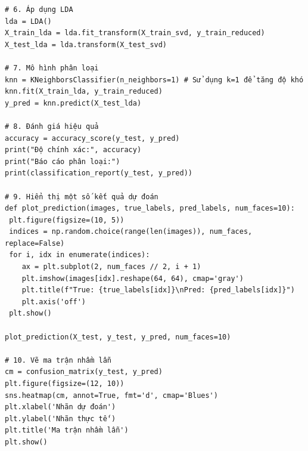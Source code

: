 \documentclass[a4paper,12pt]{extarticle}
\begin{document}
\begin{verbatim}
# 6. Áp dụng LDA
lda = LDA()
X_train_lda = lda.fit_transform(X_train_svd, y_train_reduced)
X_test_lda = lda.transform(X_test_svd)

# 7. Mô hình phân loại
knn = KNeighborsClassifier(n_neighbors=1) # Sử dụng k=1 để tăng độ khó
knn.fit(X_train_lda, y_train_reduced)
y_pred = knn.predict(X_test_lda)

# 8. Đánh giá hiệu quả
accuracy = accuracy_score(y_test, y_pred)
print("Độ chính xác:", accuracy)
print("Báo cáo phân loại:")
print(classification_report(y_test, y_pred))

# 9. Hiển thị một số kết quả dự đoán
def plot_prediction(images, true_labels, pred_labels, num_faces=10):
 plt.figure(figsize=(10, 5))
 indices = np.random.choice(range(len(images)), num_faces, replace=False)
 for i, idx in enumerate(indices):
    ax = plt.subplot(2, num_faces // 2, i + 1)
    plt.imshow(images[idx].reshape(64, 64), cmap='gray')
    plt.title(f"True: {true_labels[idx]}\nPred: {pred_labels[idx]}")
    plt.axis('off')
 plt.show()

plot_prediction(X_test, y_test, y_pred, num_faces=10)

# 10. Vẽ ma trận nhầm lẫn
cm = confusion_matrix(y_test, y_pred)
plt.figure(figsize=(12, 10))
sns.heatmap(cm, annot=True, fmt='d', cmap='Blues')
plt.xlabel('Nhãn dự đoán')
plt.ylabel('Nhãn thực tế')
plt.title('Ma trận nhầm lẫn')
plt.show()
\end{verbatim}
\end{document}
